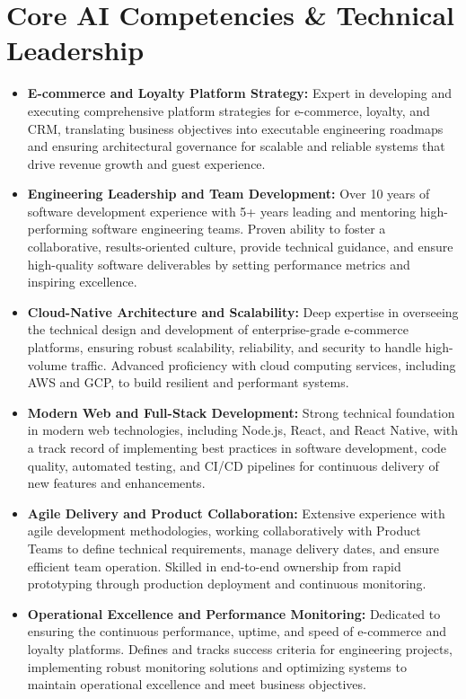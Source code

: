 \documentclass[9pt, letterpaper]{extarticle}
\begin{document}
\section{Core AI Competencies \& Technical Leadership}
\begin{itemize}
\item \textbf{E-commerce  and  Loyalty Platform Strategy:} Expert in developing and executing comprehensive platform strategies for e-commerce, loyalty, and CRM, translating business objectives into executable engineering roadmaps and ensuring architectural governance for scalable and reliable systems that drive revenue growth and guest experience.\item \textbf{Engineering Leadership  and  Team Development:} Over 10 years of software development experience with 5+ years leading and mentoring high-performing software engineering teams. Proven ability to foster a collaborative, results-oriented culture, provide technical guidance, and ensure high-quality software deliverables by setting performance metrics and inspiring excellence.\item \textbf{Cloud-Native Architecture  and  Scalability:} Deep expertise in overseeing the technical design and development of enterprise-grade e-commerce platforms, ensuring robust scalability, reliability, and security to handle high-volume traffic. Advanced proficiency with cloud computing services, including AWS and GCP, to build resilient and performant systems.\item \textbf{Modern Web  and  Full-Stack Development:} Strong technical foundation in modern web technologies, including Node.js, React, and React Native, with a track record of implementing best practices in software development, code quality, automated testing, and CI/CD pipelines for continuous delivery of new features and enhancements.\item \textbf{Agile Delivery  and  Product Collaboration:} Extensive experience with agile development methodologies, working collaboratively with Product Teams to define technical requirements, manage delivery dates, and ensure efficient team operation. Skilled in end-to-end ownership from rapid prototyping through production deployment and continuous monitoring.\item \textbf{Operational Excellence  and  Performance Monitoring:} Dedicated to ensuring the continuous performance, uptime, and speed of e-commerce and loyalty platforms. Defines and tracks success criteria for engineering projects, implementing robust monitoring solutions and optimizing systems to maintain operational excellence and meet business objectives.
\end{itemize}
\end{document}
